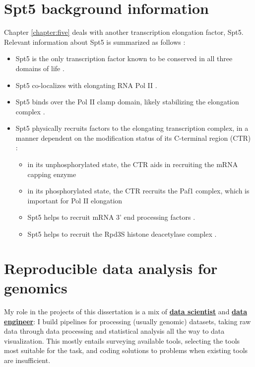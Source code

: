 \section{Spt5 background information}

Chapter \ref{chapter:five} deals with another transcription elongation factor, Spt5.
Relevant information about Spt5 is summarized as follows \citep{shetty2017}:

\begin{itemize}[nosep, topsep=.5em]
    \item Spt5 is the only transcription factor known to be conserved in all three domains of life \citep{hartzog2013, werner2012}.
    \item Spt5 co-localizes with elongating RNA Pol II \citep{mayer2010, rahl2010}.
    \item Spt5 binds over the Pol II clamp domain, likely stabilizing the elongation complex \citep{hirtreiter2010, klein2011, martinez-rucobo2011}.
    \item Spt5 physically recruits factors to the elongating transcription complex, in a manner dependent on the modification status of its C-terminal region (CTR) \citep{hartzog2013}:
    \begin{itemize}[nosep]
        \item in its unphosphorylated state, the CTR aids in recruiting the mRNA capping enzyme \citep{doamekpor2014, doamekpor2015, schneider2010, wen1999}
        \item in its phosphorylated state, the CTR recruits the Paf1 complex, which is important for Pol II elongation \citep{liu2009, mbogning2013, wier2013, zhou2009}
        \item Spt5 helps to recruit mRNA 3' end processing factors \citep{mayer2012, stadelmayer2014, yamamoto2014}.
        \item Spt5 helps to recruit the Rpd3S histone deacetylase complex \citep{drouin2010}.
    \end{itemize}
\end{itemize}

\section{Reproducible data analysis for genomics}

My role in the projects of this dissertation is a mix of \href{https://blog.insightdatascience.com/data-science-vs-data-engineering-62da7678adaa}{\textbf{data scientist}} and \href{https://blog.insightdatascience.com/data-science-vs-data-engineering-62da7678adaa}{\textbf{data engineer}}: I build pipelines for processing (usually genomic) datasets, taking raw data through data processing and statistical analysis all the way to data visualization.
This mostly entails surveying available tools, selecting the tools most suitable for the task, and coding solutions to problems when existing tools are insufficient.

